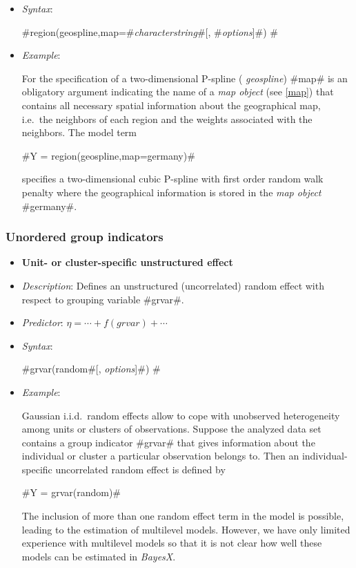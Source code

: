 \begin{itemize}
\item[] {\em Syntax}:

#region(geospline,map=#{\em characterstring}#[, #{\em options}]#) #
\item[] {\em Example}:

For the specification of a two-dimensional P-spline ({\em
geospline}) #map# is an obligatory argument indicating the name of
a {\em map object} (see \autoref{map}) that contains all necessary
spatial information about the geographical map, i.e.~the neighbors
of each region and the weights associated with the neighbors. The
model term

#Y = region(geospline,map=germany)#

specifies a two-dimensional cubic P-spline with first order random
walk penalty where the geographical information is stored in the
{\em map object} #germany#.
\end{itemize}

\subsubsection*{Unordered group indicators}

\begin{itemize}
\item[]{\bf\sffamily Unit- or cluster-specific unstructured
effect}

\item[] {\em Description}: Defines an unstructured (uncorrelated)
random effect with respect to grouping variable #grvar#. \item[]
{\em Predictor}: $\eta = \cdots + f(grvar) + \cdots$ \item[] {\em
Syntax}:

#grvar(random#[, {\em options}]#) #
\item[] {\em Example}:

Gaussian i.i.d.~random effects allow to cope with unobserved
heterogeneity among units or clusters of observations. Suppose the
analyzed data set contains a group indicator #grvar# that gives
information about the individual or cluster a particular
observation belongs to. Then an individual-specific uncorrelated
random effect is defined by

#Y = grvar(random)#

The inclusion of more than one random effect term in the model is
possible, leading to the estimation of multilevel models. However,
we have only limited experience with multilevel models so that it
is not clear how well these models can be estimated in {\em
BayesX}.
\end{itemize}

